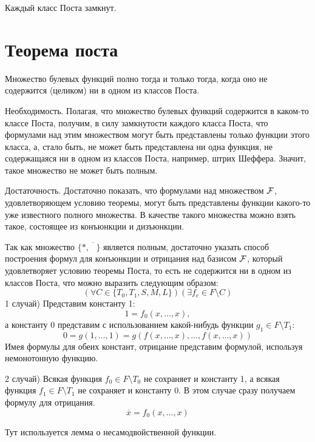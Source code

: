 

\title{}
\author{Козырнов Александр Дмитриевич, ИУ7-32Б}
\date{\today}


\begin{theorem}
Каждый класс Поста замкнут.
\end{theorem}

\section{Теорема поста}

\begin{theorem}
Множество булевых функций полно тогда и только тогда, когда оно не содержится (целиком)
ни в одном из классов Поста.
\end{theorem}

\begin{myproof}
Необходимость. Полагая, что множество булевых функций содержится в каком-то классе Поста,
получим, в силу замкнутости каждого класса Поста, что формулами над этим множеством могут быть
представлены только функции этого класса, а, стало быть, не может быть представлена ни одна функция,
не содержащаяся ни в одном из классов Поста, например, штрих Шеффера. Значит, такое множество не может
быть полным.

Достаточность. Достаточно показать, что формулами над множеством ${\cal F}$, удовлетворяющем
условию теоремы, могут быть представлены функции какого-то уже известного полного множества. В
качестве такого множества можно взять такое, состоящее из конъюнкции и дизъюнкции.

Так как множество $\{*, \overline{\phantom{A}}\} $ является полным, достаточно указать способ
построения формул для конъюнкции и отрицания над базисом ${\cal F}$, который удовлетворяет
условию теоремы Поста, то есть не содержится ни в одном из классов Поста, что
можно выразить следующим образом:
\[
    (\forall C \in \{T_0,T_1,S,M,L\} )(\exists f_c \in F\setminus C)
\]
1 случай)
Представим константу 1:
\[
1 = f_0(x,\ldots,x),
\]
а константу 0 представим с использованием какой-нибудь функции $g_1 \in F\setminus T_1:$ 
\[
0 = g(1,\ldots,1) = g(f(x,\ldots,x), \ldots, f(x,\ldots,x))
\]
Имея формулы для обеих констант, отрицание представим формулой, используя немонотонную
функцию.

\medskip

2 случай) Всякая функция $f_0 \in F \setminus T_0$ не сохраняет и константу 1, а всякая
функция $f_1 \in F \setminus T_1$ не сохраняет и константу 0. В этом случае
сразу получаем формулу для отрицания.
\[
\overline{x} = f_0(x,\ldots,x)
\] 

Тут используется лемма о несамодвойственной функции.
\end{myproof}

